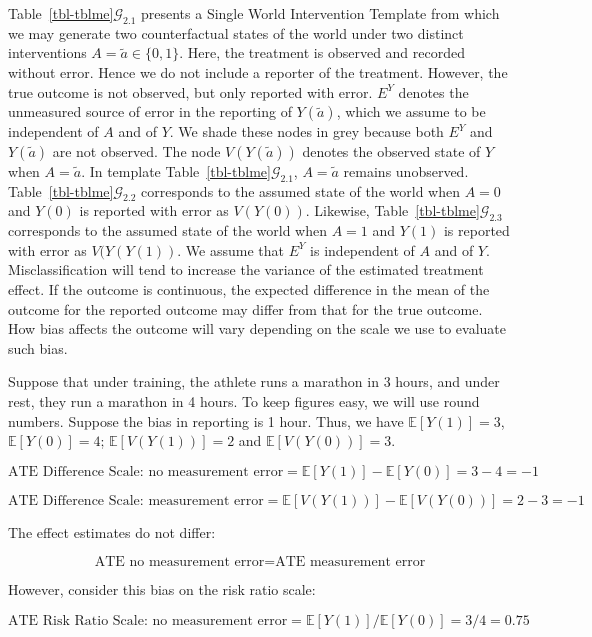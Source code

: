 \documentclass[
  single column]{article}
\begin{document}
Table~\ref{tbl-tblme}\(\mathcal{G}_{2.1}\) presents a Single World
Intervention Template from which we may generate two counterfactual
states of the world under two distinct interventions
\(A = \tilde{a} \in \{0,1\}\). Here, the treatment is observed and
recorded without error. Hence we do not include a reporter of the
treatment. However, the true outcome is not observed, but only reported
with error. \(E^Y\) denotes the unmeasured source of error in the
reporting of \(Y(\tilde{a})\), which we assume to be independent of
\(A\) and of \(Y\). We shade these nodes in grey because both \(E^Y\)
and \(Y(\tilde{a})\) are not observed. The node \(V(Y(\tilde{a}))\)
denotes the observed state of \(Y\) when \(A = \tilde{a}\). In template
Table~\ref{tbl-tblme}\(\mathcal{G}_{2.1}\), \(A = \tilde{a}\) remains
unobserved. Table~\ref{tbl-tblme}\(\mathcal{G}_{2.2}\) corresponds to
the assumed state of the world when \(A=0\) and \(Y(0)\) is reported
with error as \(V(Y(0))\). Likewise,
Table~\ref{tbl-tblme}\(\mathcal{G}_{2.3}\) corresponds to the assumed
state of the world when \(A=1\) and \(Y(1)\) is reported with error as
\(V(Y(Y(1))\). We assume that \(E^Y\) is independent of \(A\) and of
\(Y\). Misclassification will tend to increase the variance of the
estimated treatment effect. If the outcome is continuous, the expected
difference in the mean of the outcome for the reported outcome may
differ from that for the true outcome. How bias affects the outcome will
vary depending on the scale we use to evaluate such bias.

Suppose that under training, the athlete runs a marathon in 3 hours, and
under rest, they run a marathon in 4 hours. To keep figures easy, we
will use round numbers. Suppose the bias in reporting is 1 hour. Thus,
we have \(\mathbb{E}[Y(1)] = 3\), \(\mathbb{E}[Y(0)] = 4\);
\(\mathbb{E}[V(Y(1))] = 2\) and \(\mathbb{E}[V(Y(0))] = 3\).

\[
\text{ATE Difference Scale: no measurement error} = \mathbb{E}[Y(1)] - \mathbb{E}[Y(0)] = 3 - 4 = -1
\]

\[
\text{ATE Difference Scale: measurement error} = \mathbb{E}[V(Y(1))] - \mathbb{E}[V(Y(0))] = 2 - 3 = -1
\]

The effect estimates do not differ:

\[
\text{ATE no measurement error} = \text{ATE measurement error}
\]

However, consider this bias on the risk ratio scale:

\[
\text{ATE Risk Ratio Scale: no measurement error} = \mathbb{E}[Y(1)] / \mathbb{E}[Y(0)] = 3 / 4 = 0.75
\]
\end{document}
